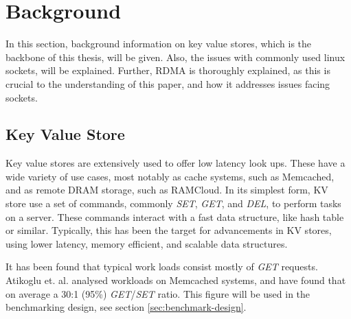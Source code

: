 
\chapter{Background}\label{ch:background} %



\ifpdf
    \graphicspath{{7/figures/PNG/}{7/figures/PDF/}{7/figures/}}
\else
    \graphicspath{{7/figures/EPS/}{7/figures/}}
\fi


%
%
In this section, background information on key value stores, which is the backbone of this thesis, will be given.
Also, the issues with commonly used linux sockets, will be explained.
Further, RDMA is thoroughly explained, as this is crucial to the understanding of this paper, and how it addresses issues facing sockets.

\section[KV-store]{Key Value Store}\label{sec:kv-store}
Key value stores are extensively used to offer low latency look ups.
These have a wide variety of use cases, most notably as cache systems, such as Memcached\cite{memcached}, and as remote DRAM storage, such as RAMCloud\cite{ousterhout2010case}.
In its simplest form, KV store use a set of commands, commonly \textit{SET}, \textit{GET}, and \textit{DEL}, to perform tasks on a server.
These commands interact with a fast data structure, like hash table or similar.
Typically, this has been the target for advancements in KV stores, using lower latency, memory efficient, and scalable data structures\cite{lim2014mica, escriva2012hyperdex}.

It has been found that typical work loads consist mostly of \textit{GET} requests.
Atikoglu et. al. analysed workloads on Memcached systems, and have found that on average a 30:1 (95\%) \textit{GET}/\textit{SET} ratio\cite{atikoglu2012workload}.
This figure will be used in the benchmarking design, see section \ref{sec:benchmark-design}.

